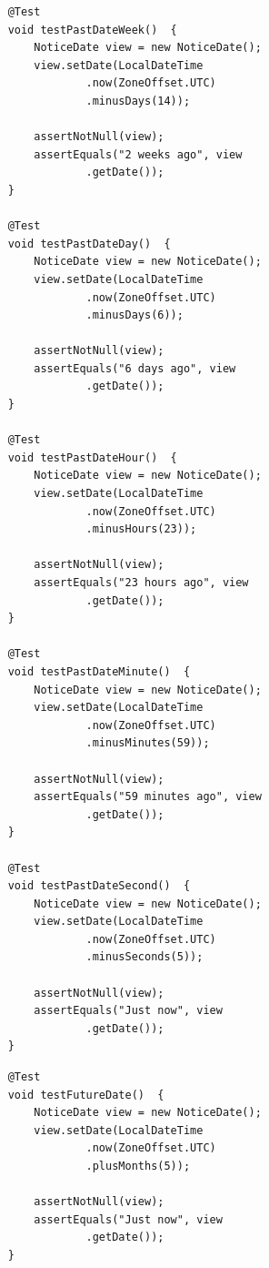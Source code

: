 \begin{listing}[!ht]
\begin{verbatim}
    @Test
    void testPastDateWeek()  {
        NoticeDate view = new NoticeDate();
        view.setDate(LocalDateTime
                .now(ZoneOffset.UTC)
                .minusDays(14));

        assertNotNull(view);
        assertEquals("2 weeks ago", view
                .getDate());
    }

    @Test
    void testPastDateDay()  {
        NoticeDate view = new NoticeDate();
        view.setDate(LocalDateTime
                .now(ZoneOffset.UTC)
                .minusDays(6));

        assertNotNull(view);
        assertEquals("6 days ago", view
                .getDate());
    }

    @Test
    void testPastDateHour()  {
        NoticeDate view = new NoticeDate();
        view.setDate(LocalDateTime
                .now(ZoneOffset.UTC)
                .minusHours(23));

        assertNotNull(view);
        assertEquals("23 hours ago", view
                .getDate());
    }

    @Test
    void testPastDateMinute()  {
        NoticeDate view = new NoticeDate();
        view.setDate(LocalDateTime
                .now(ZoneOffset.UTC)
                .minusMinutes(59));

        assertNotNull(view);
        assertEquals("59 minutes ago", view
                .getDate());
    }

    @Test
    void testPastDateSecond()  {
        NoticeDate view = new NoticeDate();
        view.setDate(LocalDateTime
                .now(ZoneOffset.UTC)
                .minusSeconds(5));

        assertNotNull(view);
        assertEquals("Just now", view
                .getDate());
    }

\end{verbatim}
\end{listing}

\clearpage

\begin{listing}[!ht]
\begin{verbatim}
    @Test
    void testFutureDate()  {
        NoticeDate view = new NoticeDate();
        view.setDate(LocalDateTime
                .now(ZoneOffset.UTC)
                .plusMonths(5));

        assertNotNull(view);
        assertEquals("Just now", view
                .getDate());
    }
\end{verbatim}
\end{listing}

